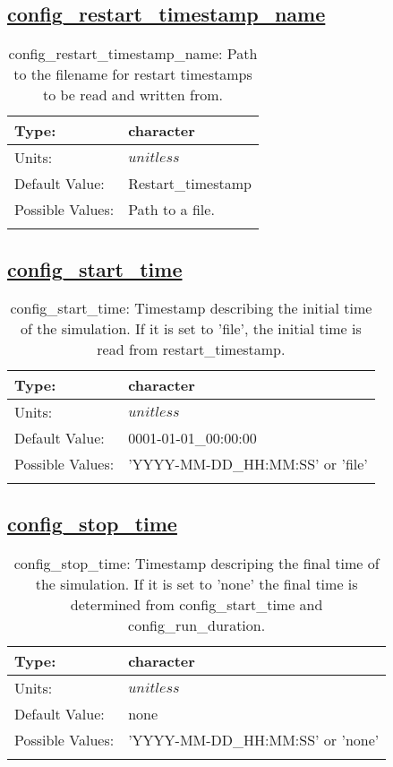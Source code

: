 \subsection[config\_restart\_timestamp\_name]{\hyperref[sec:nm_tab_time_management]{config\_restart\_timestamp\_name}}
\label{subsec:nm_sec_config_restart_timestamp_name}
\begin{center}
\begin{longtable}{| p{2.0in} || p{4.0in} |}
    \hline
    Type: & character \\
    \hline
    Units: & $unitless$ \\
    \hline
    Default Value: & Restart\_timestamp \\
    \hline
    Possible Values: & Path to a file. \\
    \hline
    \caption{config\_restart\_timestamp\_name: Path to the filename for restart timestamps to be read and written from.}
\end{longtable}
\end{center}
\subsection[config\_start\_time]{\hyperref[sec:nm_tab_time_management]{config\_start\_time}}
\label{subsec:nm_sec_config_start_time}
\begin{center}
\begin{longtable}{| p{2.0in} || p{4.0in} |}
    \hline
    Type: & character \\
    \hline
    Units: & $unitless$ \\
    \hline
    Default Value: & 0001-01-01\_00:00:00 \\
    \hline
    Possible Values: & 'YYYY-MM-DD\_HH:MM:SS' or 'file' \\
    \hline
    \caption{config\_start\_time: Timestamp describing the initial time of the simulation. If it is set to 'file', the initial time is read from restart\_timestamp.}
\end{longtable}
\end{center}
\subsection[config\_stop\_time]{\hyperref[sec:nm_tab_time_management]{config\_stop\_time}}
\label{subsec:nm_sec_config_stop_time}
\begin{center}
\begin{longtable}{| p{2.0in} || p{4.0in} |}
    \hline
    Type: & character \\
    \hline
    Units: & $unitless$ \\
    \hline
    Default Value: & none \\
    \hline
    Possible Values: & 'YYYY-MM-DD\_HH:MM:SS' or 'none' \\
    \hline
    \caption{config\_stop\_time: Timestamp descriping the final time of the simulation. If it is set to 'none' the final time is determined from config\_start\_time and config\_run\_duration.}
\end{longtable}
\end{center}
